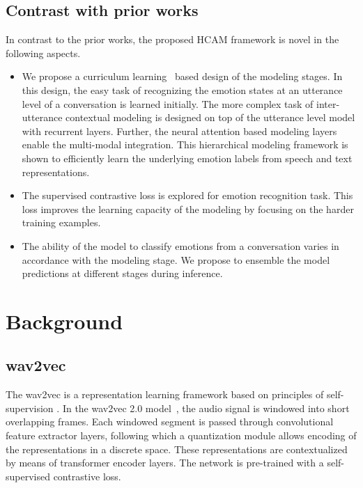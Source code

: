 \documentclass[lettersize,journal]{IEEEtran}
\begin{document}
\subsection{Contrast with prior works}
In contrast to the prior works, the proposed HCAM framework is novel in the following aspects. 
\begin{itemize}
    \item We propose a curriculum learning~\cite{bengio2009curriculum} based design of the modeling stages.  In this design, the easy task of recognizing the emotion states at an utterance level of a conversation is learned initially. The more complex task of inter-utterance contextual modeling is designed on top of the utterance level model with recurrent layers. Further, the neural attention based modeling layers enable the multi-modal integration. This hierarchical modeling framework is shown to efficiently learn the underlying emotion labels from speech and text representations.
\item The supervised contrastive loss is explored for emotion recognition task. This loss  improves the learning capacity of the modeling by focusing on the harder training examples. 
    \item The ability of the model to classify emotions from a conversation varies in accordance with the modeling stage. We propose to ensemble the model predictions at different stages during inference.
\end{itemize} 

\section{Background}\label{background}
\subsection{wav2vec} 
The wav2vec is a representation learning framework based on principles of self-supervision \cite{schneider2019wav2vec}. In the wav2vec 2.0 model~\cite{baevski2020wav2vec}, the audio signal is windowed into short overlapping frames.   Each windowed segment is  passed through convolutional feature extractor layers, following which a quantization module allows encoding of the representations in a discrete space. These representations are  contextualized  by means of transformer encoder layers. The network is pre-trained with a self-supervised  contrastive loss. 
\end{document}

